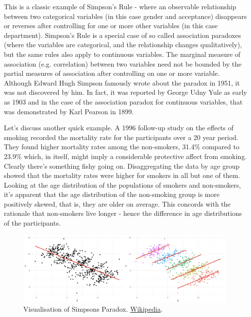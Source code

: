 This is a classic example of Simpson's Rule - where an observable relationship between two categorical variables (in this case gender and acceptance) disappears or reverses after controlling for one or more other variables (in this case department). Simpson's Rule is a special case of so called association paradoxes (where the variables are categorical, and the relationship changes qualitatively), but the same rules also apply to continuous variables. The marginal measure of association (e.g. correlation) between two variables need not be bounded by the partial measures of association after controlling on one or more variable. Although Edward Hugh Simpson famously wrote about the paradox in 1951, it was not discovered by him. In fact, it was reported by George Udny Yule as early as 1903 and in the case of the association paradox for continuous variables, that was demonstrated by Karl Pearson in 1899.

Let's discuss another quick example. A 1996 follow-up study on the effects of smoking recorded the mortality rate for the participants over a 20 year period. They found higher mortality rates among the non-smokers, 31.4\% compared to 23.9\% which, in itself, might imply a considerable protective affect from smoking. Clearly there's something fishy going on. Disaggregating the data by age group showed that the mortality rates were higher for smokers in all but one of them. Looking at the age distribution of the populations of smokers and non-smokers, it's apparent that the age distribution of the non-smoking group is more positively skewed, that is, they are older on average. This concords with the rationale that non-smokers live longer - hence the difference in age distributions of the participants.
%
\begin{figure}[h!]
\centering
\includegraphics[width=0.98\textwidth]{01_MotivationAndContext/figures/Fig_SimpParaReg.png}
\caption{Visualisation of Simpsons Paradox. \href{https://en.wikipedia.org/wiki/Simpson\%27s_paradox}{Wikipedia}.}
\label{fig_SimpsPara}
\end{figure}

